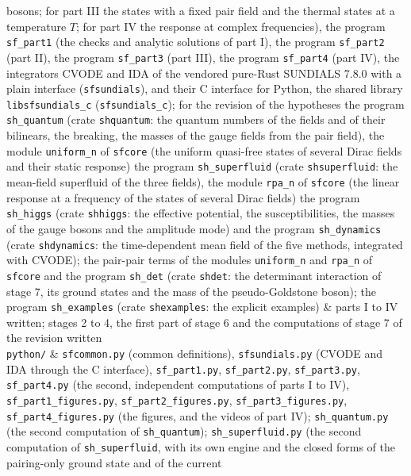 \documentclass[
  10pt,
]{article}
\begin{document}
\begin{longtable}[]
bosons; for part III the states with a fixed pair field and the thermal
states at a temperature \(T\); for part IV the response at complex
frequencies), the program \texttt{sf\_part1} (the checks and analytic
solutions of part I), the program \texttt{sf\_part2} (part II), the
program \texttt{sf\_part3} (part III), the program \texttt{sf\_part4}
(part IV), the integrators CVODE and IDA of the vendored pure-Rust
SUNDIALS 7.8.0 with a plain interface (\texttt{sfsundials}), and their C
interface for Python, the shared library \texttt{libsfsundials\_c}
(\texttt{sfsundials\_c}); for the revision of the hypotheses the program
\texttt{sh\_quantum} (crate \texttt{shquantum}: the quantum numbers of
the fields and of their bilinears, the breaking, the masses of the gauge
fields from the pair field), the module \texttt{uniform\_n} of
\texttt{sfcore} (the uniform quasi-free states of several Dirac fields
and their static response) the program \texttt{sh\_superfluid} (crate
\texttt{shsuperfluid}: the mean-field superfluid of the three fields),
the module \texttt{rpa\_n} of \texttt{sfcore} (the linear response at a
frequency of the states of several Dirac fields) the program
\texttt{sh\_higgs} (crate \texttt{shhiggs}: the effective potential, the
susceptibilities, the masses of the gauge bosons and the amplitude mode)
and the program \texttt{sh\_dynamics} (crate \texttt{shdynamics}: the
time-dependent mean field of the five methods, integrated with CVODE);
the pair-pair terms of the modules \texttt{uniform\_n} and
\texttt{rpa\_n} of \texttt{sfcore} and the program \texttt{sh\_det}
(crate \texttt{shdet}: the determinant interaction of stage 7, its
ground states and the mass of the pseudo-Goldstone boson); the program
\texttt{sh\_examples} (crate \texttt{shexamples}: the explicit examples)
& parts I to IV written; stages 2 to 4, the first part of stage 6 and
the computations of stage 7 of the revision written \\
\texttt{python/} & \texttt{sfcommon.py} (common definitions),
\texttt{sfsundials.py} (CVODE and IDA through the C interface),
\texttt{sf\_part1.py}, \texttt{sf\_part2.py}, \texttt{sf\_part3.py},
\texttt{sf\_part4.py} (the second, independent computations of parts I
to IV), \texttt{sf\_part1\_figures.py}, \texttt{sf\_part2\_figures.py},
\texttt{sf\_part3\_figures.py}, \texttt{sf\_part4\_figures.py} (the
figures, and the videos of part IV); \texttt{sh\_quantum.py} (the second
computation of \texttt{sh\_quantum}); \texttt{sh\_superfluid.py} (the
second computation of \texttt{sh\_superfluid}, with its own engine and
the closed forms of the pairing-only ground state and of the current

\end{longtable}
\end{document}
